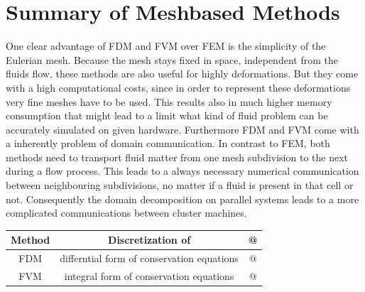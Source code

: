 \section{Summary of Meshbased Methods}

One clear advantage of FDM and FVM over FEM is the simplicity of the Eulerian mesh.  Because the mesh stays fixed in space, independent from the fluids flow, these methods are also useful for highly deformations. But they come with a high computational costs, since in order to represent these deformations very fine meshes have to be used. This results also in much higher memory consumption that might lead to a limit what kind of fluid problem can be accurately simulated on given hardware. Furthermore FDM and FVM come with a inherently problem of domain communication. In contrast to FEM, both methods need to transport fluid matter from one mesh subdivision to the next during a flow process. This leads to a always necessary numerical communication between neighbouring subdivisions, no matter if a fluid is present in that cell or not. Consequently the domain decomposition on parallel systems leads to a more complicated communications between cluster machines.


\begin{tabular}{|c|c|c|}
\hline
	Method & Discretization of & @\\
\hline
	FDM & differntial form of conservation equations & @\\
\hline
	FVM & integral form of conservation equations & @\\
\hline
\end{tabular}




